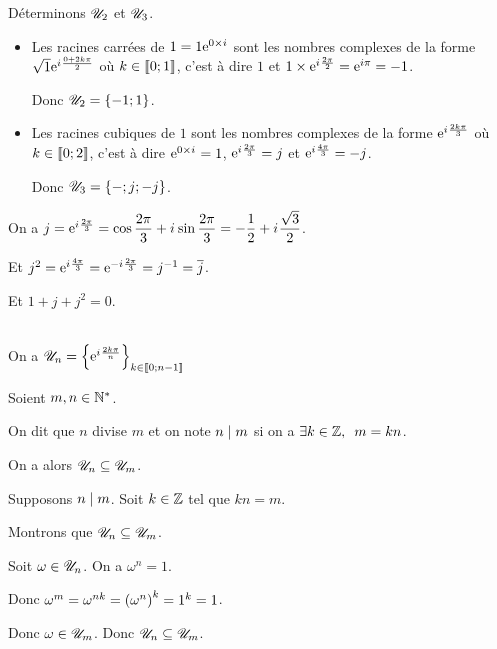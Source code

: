 \begin{ex}
Déterminons \(\mathscr{U}_2\) et \(\mathscr{U}_3\).

\begin{itemize}
\item Les racines carrées de \(1=1\mathrm{e}^{0\times i\mkern1mu}\) sont les nombres complexes de la forme \(\sqrt{1}\mathrm{e}^{i\mkern1mu\frac{0+2k\pi}{2}}\) où \(k\in\left\llbracket0;1\right\rrbracket\), c'est à dire \(1\) et \(1\times\mathrm{e}^{i\mkern1mu\frac{2\pi}{2}}=\mathrm{e}^{i\pi}=-1\).

Donc \(\mathscr{U}_2=\left\lbrace-1;1\right\rbrace\).

\item Les racines cubiques de \(1\) sont les nombres complexes de la forme \(\mathrm{e}^{i\mkern1mu\frac{2k\pi}{3}}\) où \(k\in\left\llbracket0;2\right\rrbracket\), c'est à dire \(\mathrm{e}^{0\times i\mkern1mu}=1\), \(\mathrm{e}^{i\mkern1mu\frac{2\pi}{3}}=j\) et \(\mathrm{e}^{i\mkern1mu\frac{4\pi}{3}}=-j\).

Donc \(\mathscr{U}_3=\left\lbrace-;j;-j\right\rbrace\).
\end{itemize}
\end{ex}

\begin{rem}
On a \(j=\mathrm{e}^{i\mkern1mu\frac{2\pi}{3}}=\cos\dfrac{2\pi}{3}+i\mkern1mu\sin\dfrac{2\pi}{3}=-\dfrac{1}{2}+i\mkern1mu\dfrac{\sqrt{3}}{2}\).

Et \(j^2=\mathrm{e}^{i\mkern1mu\frac{4\pi}{3}}=\mathrm{e}^{-i\mkern1mu\frac{2\pi}{3}}=j^{-1}=\overline{j}\).

Et \(1+j+j^2=0\).
\end{rem}

\begin{rem}~\\
On a \(\mathscr{U}_n=\left\lbrace\mathrm{e}^{i\mkern1mu\frac{2k\pi}{n}}\right\rbrace_{k\in\left\llbracket0;n-1\right\rrbracket}\)
\end{rem}

\begin{rem}
Soient \(m,n\in\mathbb{N}^*\).

On dit que \(n\) divise \(m\) et on note \(n\mid m\) si on a \(\quantifs{\exists k\in\Z}m=kn\).

On a alors \(\mathscr{U}_n\subseteq\mathscr{U}_m\).
\end{rem}

\begin{dem}
Supposons \(n\mid m\). Soit \(k\in\mathbb{Z}\) tel que \(kn=m\).

Montrons que \(\mathscr{U}_n\subseteq\mathscr{U}_m\).

Soit \(\omega\in\mathscr{U}_n\). On a \(\omega^n=1\).

Donc \(\omega^m=\omega^{nk}=\left(\omega^n\right)^k=1^k=1\).

Donc \(\omega\in\mathscr{U}_m\). Donc \(\mathscr{U}_n\subseteq\mathscr{U}_m\).
\end{dem}

